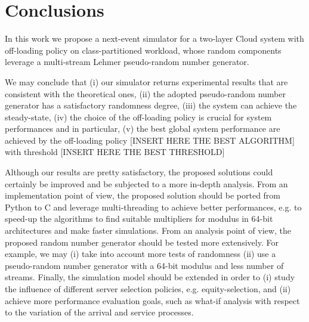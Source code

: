 \section{Conclusions}
\label{sec:conclusions}

In this work we propose a next-event simulator for a two-layer Cloud system with off-loading policy on class-partitioned workload, whose random components leverage a multi-stream Lehmer pseudo-random number generator.

We may conclude that 
(i) our simulator returns experimental results that are consistent with the theoretical ones, 
(ii) the adopted pseudo-random number generator has a satisfactory randomness degree,
(iii) the system can achieve the steady-state,
(iv) the choice of the off-loading policy is crucial for system performances and in particular, 
(v) the best global system performance are achieved by the off-loading policy [INSERT HERE THE BEST ALGORITHM] with threshold [INSERT HERE THE BEST THRESHOLD]

Although our results are pretty satisfactory, the proposed solutions could certainly be improved and be subjected to a more in-depth analysis.
%
From an implementation point of view, the proposed solution should be ported from Python to C and leverage multi-threading to achieve better performances, e.g. to speed-up the algorithms to find suitable multipliers for modulus in 64-bit architectures and make faster simulations.
%
From an analysis point of view, the proposed random number generator should be tested more extensively. For example, we may (i) take into account more tests of randomness (ii) use a pseudo-random number generator with a 64-bit modulus and less number of streams.
%
Finally, the simulation model should be extended in order to 
(i) study the influence of different server selection policies, e.g. equity-selection, and 
(ii) achieve more performance evaluation goals, such as what-if analysis with respect to the variation of the arrival and service processes.
